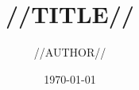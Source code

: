 \documentclass[12pt]{article}
\begin{document}
\pagestyle{empty}

\title{//TITLE//}
\author{//AUTHOR//}
\date{\today}

\maketitle

\newpage

\begin{enumerate}
\begin{fullround}


\end{fullround}
\end{enumerate}
\end{document}
